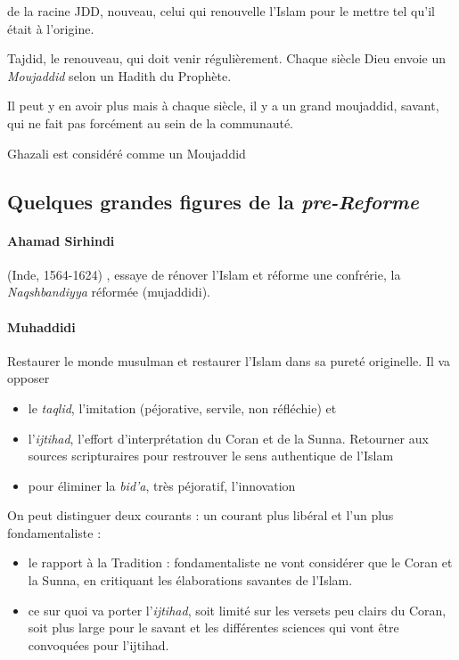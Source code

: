  \begin{Def}[Moujaddid]
 de la racine JDD, nouveau, celui qui renouvelle l'Islam pour le mettre tel qu'il était à l'origine. 
 \end{Def}

 
 \begin{Def}[tajdid]
 Tajdid, le renouveau, qui doit venir régulièrement. Chaque siècle Dieu envoie un \textit{Moujaddid} selon un Hadith du Prophète.
 \end{Def}
 
 
 Il peut y en avoir plus mais à chaque siècle, il y a un grand moujaddid, savant, qui ne fait pas forcément au sein de la communauté. 
  \begin{Ex}
 Ghazali est considéré comme un Moujaddid
 \end{Ex}
 
 
 \subsection{Quelques grandes figures de la \textit{pre-Reforme}}
 

\paragraph{Ahamad Sirhindi} (Inde, 1564-1624) , essaye de rénover l'Islam et réforme une confrérie, la \emph{Naqshbandiyya} réformée (mujaddidi). 
\paragraph{Muhaddidi} Restaurer le monde musulman et restaurer l'Islam dans sa pureté originelle. Il va opposer 
\begin{itemize}
    \item le \emph{taqlid}, l'imitation (péjorative, servile, non réfléchie) et
    \item l'\emph{ijtihad}, l'effort d'interprétation du Coran et de la Sunna. Retourner aux sources scripturaires pour restrouver le sens authentique de l'Islam
    \item pour éliminer la \emph{bid'a}, très péjoratif, l'innovation
\end{itemize}  

On peut distinguer deux courants : un courant plus libéral et l'un plus fondamentaliste :
\begin{itemize}
    \item le rapport à la Tradition : fondamentaliste ne vont considérer que le Coran et la Sunna, en critiquant les élaborations savantes de l'Islam. 
    \item ce sur quoi va porter l'\emph{ijtihad}, soit limité sur les versets peu clairs du Coran, soit plus large pour le savant et les différentes sciences qui vont être convoquées pour l'ijtihad.
\end{itemize}


